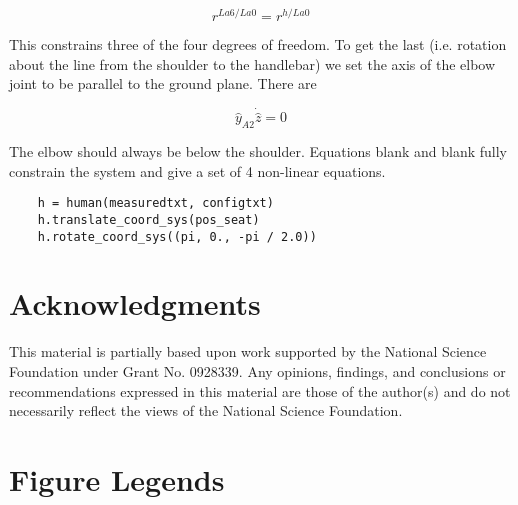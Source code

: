 \documentclass[10pt]{article}
\begin{document}
\begin{equation}
	r^{La6/La0} = r^{h/La0}
\end{equation}

This constrains three of the four degrees of freedom. To get the last (i.e.
rotation about the line from the shoulder to the handlebar) we set the axis of
the elbow joint to be parallel to the ground plane. There are  

\begin{equation}
  \hat{y}_{A2}\dot\hat{z} = 0
\end{equation}

The elbow should always be below the shoulder. Equations blank and blank fully
constrain the system and give a set of 4 non-linear equations.

\begin{verbatim}
	h = human(measuredtxt, configtxt)
	h.translate_coord_sys(pos_seat)
	h.rotate_coord_sys((pi, 0., -pi / 2.0))
\end{verbatim}

\section*{Acknowledgments}
This material is partially based upon work supported by the National Science
Foundation under Grant No. 0928339. Any opinions, findings, and conclusions or
recommendations expressed in this material are those of the author(s) and do
not necessarily reflect the views of the National Science Foundation.


\section*{Figure Legends}
\end{document}
